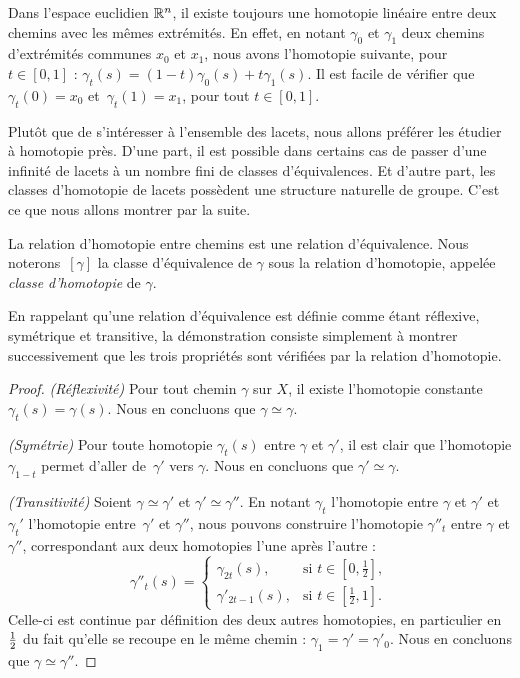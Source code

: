 \begin{exemple}
Dans l'espace euclidien $\mathbb{R}^n$, il existe toujours une homotopie linéaire entre deux chemins avec les mêmes extrémités. En effet, en notant $\gamma_0$ et $\gamma_1$ deux chemins d'extrémités communes $x_0$ et $x_1$, nous avons l'homotopie suivante, pour~$t\in[0,1]$ :  $\gamma_t(s)=(1-t)\gamma_0(s)+t\gamma_1(s)$. Il est facile de vérifier que $\gamma_t(0)=x_0$ et~$\gamma_t(1)=x_1$, pour tout $t\in[0,1]$.
\end{exemple}

Plutôt que de s'intéresser à l'ensemble des lacets, nous allons préférer les étudier à homotopie près. D'une part, il est possible dans certains cas de passer d'une infinité de lacets à un nombre fini de classes d'équivalences. Et d'autre part, les classes d'homotopie de lacets possèdent une structure naturelle de groupe. C'est ce que nous allons montrer par la suite.

\begin{proposition}
La relation d'homotopie entre chemins est une relation d'équivalence. Nous noterons~$[\gamma]$ la classe d'équivalence de $\gamma$ sous la relation d'homotopie, appelée \emph{classe d'homotopie} de $\gamma$.
\end{proposition}

En rappelant qu'une relation d'équivalence est définie comme étant réflexive, symétrique et transitive, la démonstration consiste simplement à montrer successivement que les trois propriétés sont vérifiées par la relation d'homotopie.
\begin{proof}
\textit{(Réflexivité)} Pour tout chemin $\gamma$ sur $X$, il existe l'homotopie constante $\gamma_t(s)=\gamma(s)$. Nous en concluons que $\gamma\simeq\gamma$.

\textit{(Symétrie)} Pour toute homotopie $\gamma_t(s)$ entre $\gamma$ et $\gamma'$, il est clair que l'homotopie $\gamma_{1-t}$ permet d'aller de~$\gamma'$ vers $\gamma$. Nous en concluons que $\gamma'\simeq\gamma$.

\textit{(Transitivité)} Soient $\gamma\simeq\gamma'$ et $\gamma'\simeq\gamma''$. En notant $\gamma_t$ l'homotopie entre $\gamma$ et $\gamma'$ et $\gamma_t'$ l'homotopie entre~$\gamma'$ et $\gamma''$, nous pouvons construire l'homotopie $\gamma''_t$ entre $\gamma$ et $\gamma''$, correspondant aux deux homotopies l'une après l'autre : \[\gamma''_t(s)= \left\{\begin{matrix}
\gamma_{2t}(s),&\text{si }t\in[0,\frac{1}{2}], \\
\gamma'_{2t-1}(s),&\text{si }t\in[\frac{1}{2},1].
\end{matrix}\right.\]Celle-ci est continue par définition des deux autres homotopies, en particulier en $1\over 2$ du fait qu'elle se recoupe en le même chemin : $\gamma_1=\gamma'=\gamma'_0$. Nous en concluons que $\gamma\simeq\gamma''$.
\end{proof}

